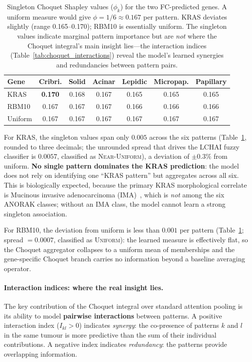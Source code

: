 \begin{table}[ht!]
\centering
\small
\caption[Singleton Choquet Shapley values ($\phi_k$) for the two
FC-predicted genes.]{Singleton Choquet Shapley values
($\phi_k$) for the two FC-predicted genes.
A uniform measure would give $\phi = 1/6 \approx 0.167$ per pattern.
KRAS deviates slightly (range 0.165--0.170); RBM10 is essentially
uniform.
The singleton values indicate marginal pattern importance but are
\emph{not} where the Choquet integral's main insight lies---the
interaction indices (Table~\ref{tab:choquet_interactions}) reveal
the model's learned synergies and redundancies between pattern
pairs.}
\label{tab:choquet_shapley}
\begin{tabular}{l c c c c c c}
\hline
\textbf{Gene} & \textbf{Cribri.} & \textbf{Solid} & \textbf{Acinar}
& \textbf{Lepidic} & \textbf{Micropap.} & \textbf{Papillary} \\
\hline
KRAS  & \textbf{0.170} & 0.168 & 0.167 & 0.165 & 0.165 & 0.165 \\
RBM10 & 0.167 & 0.167 & 0.167 & 0.166 & 0.166 & 0.166 \\
\hline
Uniform & 0.167 & 0.167 & 0.167 & 0.167 & 0.167 & 0.167 \\
\hline
\end{tabular}
\end{table}

For KRAS, the singleton values span only $0.005$ across the six
patterns (Table~\ref{tab:choquet_shapley}, rounded to three
decimals; the unrounded spread that drives the LCHAI fuzzy
classifier is $0.0057$, classified as \textsc{Near-Uniform}), a
deviation of $\pm 0.3\%$ from uniform.
\textbf{No single pattern dominates the KRAS prediction}: the model
does not rely on identifying one ``KRAS pattern'' but aggregates
across all six.
This is biologically expected, because the primary KRAS
morphological correlate is Mucinous invasive adenocarcinoma
(IMA)~\cite{shim2015krasmucinous}, which is \emph{not} among the
six ANORAK classes; without an IMA class, the model cannot learn
a strong singleton association.

For RBM10, the deviation from uniform is less than $0.001$ per
pattern (Table~\ref{tab:choquet_shapley}; spread $=0.0007$,
classified as \textsc{Uniform}): the learned measure is effectively
flat, so the Choquet aggregator collapses to a uniform mean of
memberships and the gene-specific Choquet branch carries no
information beyond a baseline averaging operator.

\paragraph{Interaction indices: where the real insight lies.}
The key contribution of the Choquet integral over standard attention
pooling is its ability to model \textbf{pairwise interactions}
between patterns.
A positive interaction index ($I_{kl} > 0$) indicates
\emph{synergy}: the co-presence of patterns $k$ and $l$ in the same
tumour is more predictive than the sum of their individual
contributions.
A negative index indicates \emph{redundancy}: the patterns provide
overlapping information.

